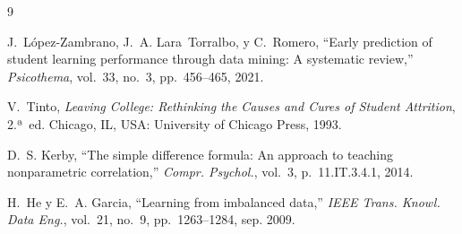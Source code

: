 
\begin{thebibliography}{9}

J.~López-Zambrano, J.~A. Lara~Torralbo, y C.~Romero,
``Early prediction of student learning performance through data
mining: A systematic review,''
\textit{Psicothema}, vol.~33, no.~3, pp.~456--465, 2021.

V.~Tinto,
\textit{Leaving College: Rethinking the Causes and Cures of
Student Attrition}, 2.ª~ed.
Chicago, IL, USA: University of Chicago Press, 1993.

D.~S. Kerby,
``The simple difference formula: An approach to teaching
nonparametric correlation,''
\textit{Compr. Psychol.}, vol.~3, p.~11.IT.3.4.1, 2014.

H.~He y E.~A. Garcia,
``Learning from imbalanced data,''
\textit{IEEE Trans. Knowl. Data Eng.}, vol.~21, no.~9,
pp.~1263--1284, sep. 2009.

\end{thebibliography}


